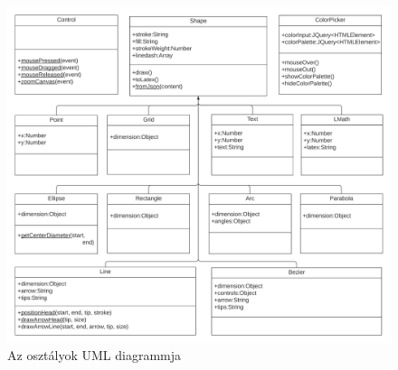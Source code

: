 \begin{figure}[!h]
	\centering
	\includegraphics[width=\textwidth]{images/uml.png}
	\caption{Az osztályok UML diagrammja}
	\label{fig:uml}
\end{figure}